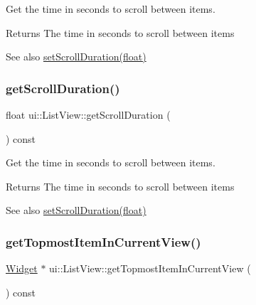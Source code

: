 Get the time in seconds to scroll between items. \begin{DoxyReturn}{Returns}
The time in seconds to scroll between items 
\end{DoxyReturn}
\begin{DoxySeeAlso}{See also}
\hyperlink{classui_1_1ListView_a9f0e93625317fa86700986bed97efc88}{set\+Scroll\+Duration(float)} 
\end{DoxySeeAlso}
\mbox{\label{classui_1_1ListView_a85116b79e39403d670411684410feef0}} 
\subsubsection{\texorpdfstring{get\+Scroll\+Duration()}{getScrollDuration()}\hspace{0.1cm}{\footnotesize\ttfamily [2/2]}}
{\footnotesize\ttfamily float ui\+::\+List\+View\+::get\+Scroll\+Duration (\begin{DoxyParamCaption}{ }\end{DoxyParamCaption}) const}

Get the time in seconds to scroll between items. \begin{DoxyReturn}{Returns}
The time in seconds to scroll between items 
\end{DoxyReturn}
\begin{DoxySeeAlso}{See also}
\hyperlink{classui_1_1ListView_a9f0e93625317fa86700986bed97efc88}{set\+Scroll\+Duration(float)} 
\end{DoxySeeAlso}
\mbox{\label{classui_1_1ListView_a301ef416364411d2f6e85f8a13dcda90}} 
\subsubsection{\texorpdfstring{get\+Topmost\+Item\+In\+Current\+View()}{getTopmostItemInCurrentView()}\hspace{0.1cm}{\footnotesize\ttfamily [1/2]}}
{\footnotesize\ttfamily \hyperlink{classui_1_1Widget}{Widget} $\ast$ ui\+::\+List\+View\+::get\+Topmost\+Item\+In\+Current\+View (\begin{DoxyParamCaption}{ }\end{DoxyParamCaption}) const}



